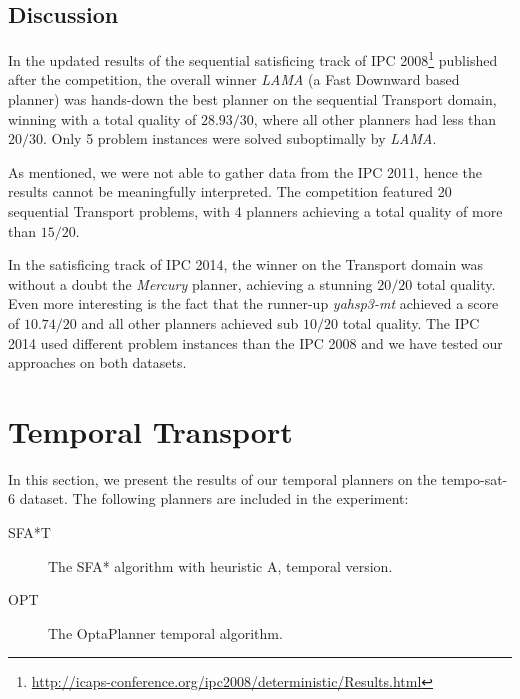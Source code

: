 \subsection{Discussion}

In the updated results of the sequential satisficing track of IPC 2008\footnote{\url{http://icaps-conference.org/ipc2008/deterministic/Results.html}} published after the competition,
the overall winner \textit{LAMA} (a Fast Downward based planner)
was hands-down the best planner on the sequential Transport domain, winning
with a total quality of $28.93/30$, where all other planners had less than $20/30$.
Only 5 problem instances were solved suboptimally by \textit{LAMA}.

As mentioned, we were not able to gather data from the IPC 2011,
hence the results cannot be meaningfully interpreted.
The competition featured 20 sequential Transport problems,
with 4 planners achieving a total quality of more than $15/20$.

In the satisficing track of IPC 2014, the winner on the Transport domain
was without a doubt the \textit{Mercury} planner, achieving
a stunning $20/20$ total quality. Even more interesting is the fact that
the runner-up \textit{yahsp3-mt} achieved a score of $10.74/20$
and all other planners achieved sub $10/20$ total quality.
The IPC 2014 used different problem instances than the IPC 2008
and we have tested our approaches on both datasets.

 















\section{Temporal Transport}

In this section, we present the results of our temporal planners on the tempo-sat-6 dataset. The following planners are included in the experiment:
\begin{description}
\item[SFA*T] The SFA* algorithm with heuristic A, temporal version. 
\item[OPT] The OptaPlanner temporal algorithm. 
\end{description}

